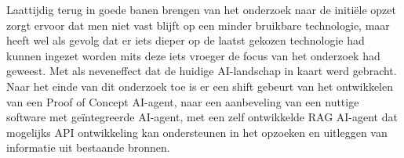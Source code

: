 Laattijdig terug in goede banen brengen van het onderzoek naar de initiële opzet zorgt ervoor dat men niet vast blijft op een minder bruikbare technologie, maar heeft wel als gevolg dat er iets dieper op de laatst gekozen technologie had kunnen ingezet worden mits deze iets vroeger de focus van het onderzoek had geweest. Met als neveneffect dat de huidige AI-landschap in kaart werd gebracht. \\

Naar het einde van dit onderzoek toe is er een shift gebeurt van het ontwikkelen van een Proof of Concept AI-agent, naar een aanbeveling van een nuttige software met geïntegreerde AI-agent, met een zelf ontwikkelde RAG AI-agent dat mogelijks API ontwikkeling kan ondersteunen in het opzoeken en uitleggen van informatie uit bestaande bronnen.


